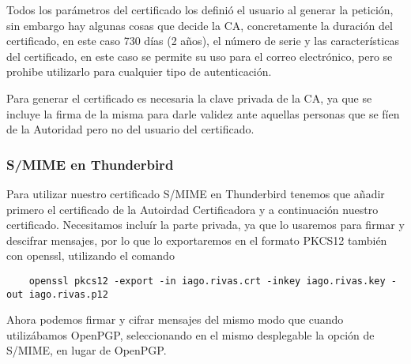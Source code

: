 Todos los parámetros del certificado los definió el usuario al generar la petición, sin embargo hay algunas cosas que decide la CA, concretamente la duración del certificado, en este caso 730 días (2 años), el número de serie y las características del certificado, en este caso se permite su uso para el correo electrónico, pero se prohibe utilizarlo para cualquier tipo de autenticación.

Para generar el certificado es necesaria la clave privada de la CA, ya que se incluye la firma de la misma para darle validez ante aquellas personas que se fíen de la Autoridad pero no del usuario del certificado.

\subsubsection{S/MIME en Thunderbird}

Para utilizar nuestro certificado S/MIME en Thunderbird tenemos que añadir primero el certificado de la Autoirdad Certificadora y a continuación nuestro certificado. Necesitamos incluír la parte privada, ya que lo usaremos para firmar y descifrar mensajes, por lo que lo exportaremos en el formato PKCS12 también con openssl, utilizando el comando

\begin{verbatim}
    openssl pkcs12 -export -in iago.rivas.crt -inkey iago.rivas.key -out iago.rivas.p12
\end{verbatim}

Ahora podemos firmar y cifrar mensajes del mismo modo que cuando utilizábamos OpenPGP, seleccionando en el mismo desplegable la opción de S/MIME, en lugar de OpenPGP.